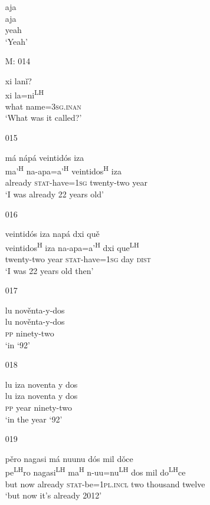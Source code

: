 \begin{itemize}
\glll aja\\
aja\\
yeah \\
\glt `Yeah'
 

\item[M: 014]
   
xi lan\v{i}?\\
xi la=ni\textsuperscript{LH}\\
what name=\textsc{3sg.inan}\\
\glt `What was it called?'
 

\item[015]
   
\glll m\'{a} n\'{a}p\'{a} veintid\'{o}s iza\\
ma'\textsuperscript{H} na-apa=a'\textsuperscript{H} veintidos\textsuperscript{H} iza\\
already \textsc{stat}-have=\textsc{1sg} twenty-two year\\
\glt `I was already 22 years old'
 

\item[016]
   
\glll veintid\'{o}s iza nap\'{a} dxi qu\v{e}\\ 
veintidos\textsuperscript{H} iza na-apa=a'\textsuperscript{H} dxi que\textsuperscript{LH}\\
twenty-two year \textsc{stat}-have=\textsc{1sg} day \textsc{dist}\\
\glt `I was 22 years old then'
 

\item[017]
   
\glll lu nov\v{e}nta-y-dos\\
 lu nov\v{e}nta-y-dos\\
 \textsc{pp} ninety-two\\
\glt `in `92'
 

\item[018]
  
\glll  lu iza noventa y dos\\
lu iza noventa y dos\\
\textsc{pp} year ninety-two\\
\glt `in the year `92'
 

\item[019]
   
\glll p\v{e}ro nagasi m\'{a} nuunu d\'{o}s mil d\v{o}ce\\
pe\textsuperscript{LH}ro nagasi\textsuperscript{LH} ma\textsuperscript{H} n-uu=nu\textsuperscript{LH} dos mil do\textsuperscript{LH}ce\\
but now already \textsc{stat}-be=\textsc{1pl.incl} two thousand twelve\\
\glt `but now it's already 2012'
 


\end{itemize}
